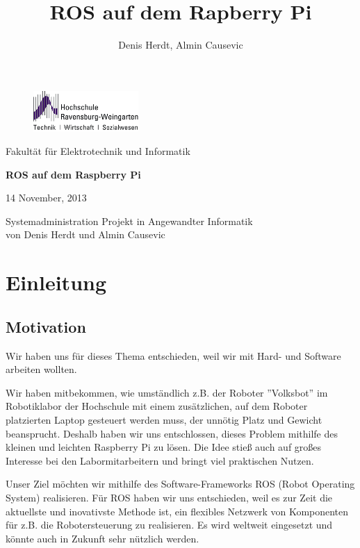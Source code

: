 \documentclass[12pt]{article}
\author{Denis Herdt, Almin Causevic}
\title{ROS auf dem Rapberry Pi}
\begin{document}
\begin{figure}[h]

\includegraphics[width=4cm]{hs-logo.jpg}
\end{figure}
Fakultät für Elektrotechnik und Informatik

\vspace{3cm}

\begin{center}

{\bf \huge ROS auf dem Raspberry Pi}
\vspace{4cm}

14 November, 2013
\vspace{1cm}

Systemadministration Projekt in Angewandter Informatik \\
von Denis Herdt und Almin Causevic

\end{center}

\pagebreak

\tableofcontents

\pagebreak

\section{Einleitung}
\subsection{Motivation}

Wir haben uns für dieses Thema entschieden, weil wir mit Hard- und Software arbeiten wollten. 

Wir haben mitbekommen, wie umständlich z.B. der Roboter ''Volksbot'' im Robotiklabor der Hochschule mit einem zusätzlichen, auf dem Roboter platzierten Laptop gesteuert werden muss, der unnötig Platz und Gewicht beansprucht. Deshalb haben wir uns entschlossen, dieses Problem mithilfe des kleinen und leichten Raspberry Pi zu lösen.
Die Idee stieß auch auf großes Interesse bei den Labormitarbeitern und bringt viel praktischen Nutzen.

Unser Ziel möchten wir mithilfe des Software-Frameworks ROS (Robot Operating System) realisieren.
Für ROS haben wir uns entschieden, weil es zur Zeit die aktuellste und inovativste Methode ist, ein flexibles Netzwerk von Komponenten für z.B. die Robotersteuerung zu realisieren. Es wird weltweit eingesetzt und könnte auch in Zukunft sehr nützlich werden.
\end{document}

